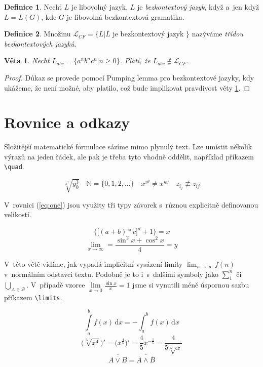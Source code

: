 \documentclass[11pt,a4paper,twocolumn,oneside]{article}
\theoremstyle{definition}
\newtheorem{definice}{Definice}[section]
\theoremstyle{plain}
\theoremstyle{plain}
\newtheorem{veta}{Věta}
\begin{document}
	\begin{definice}
Nechť $L$ je libovolný jazyk. $L$ je {\itshape bezkontextový jazyk}, když a~jen když $L=L(G)$, kde $G$ je libovolná bezkontextová gramatika.
	\end{definice}	
	
	\begin{definice}
Množinu $\mathcal{L}_{CF}=\{L|L$ je bezkontextový jazyk $\}$ nazýváme {\itshape třídou bezkontextových jazyků}.
	\end{definice}
	
	\begin{veta} \label{veta_1}
{\itshape Nechť} $L_{abc}=\{a^n b^n c^n|n \geq 0\}$. Platí, že $L_{abc} \notin \mathcal{L}_{CF}$.
	\end{veta}

\begin{proof}
\noindent Důkaz se provede pomocí Pumping lemma pro bezkontextové jazyky, kdy ukážeme, že není možné, aby platilo, což bude implikovat pravdivost věty \ref{veta_1}.
\end{proof}

	\section{Rovnice a odkazy}

Složitější matematické formulace sázíme mimo plynulý text. Lze umístit několik výrazů na jeden řádek, ale pak je třeba tyto vhodně oddělit, například příkazem \verb|\quad|.

$$\sqrt[x^2]{y^3_0} \quad \mathbb{N}=\{0,1,2,...\} \quad x^{y^y} \neq x^{yy} \quad z_{i_j} \not\equiv z_{ij}$$

V~rovnici (\ref{eq:one}) jsou využity tři typy závorek s~různou explicitně definovanou velikostí. \medskip

\begin{equation} \label{eq:one}
\bigg\{\Big[(a+b)*c\Big]^d +1\bigg\}=x
\end{equation}
$$\lim_{x\to\infty}= \frac{\sin^2x+\cos^2x}{4}=y$$

V~této větě vidíme, jak vypadá implicitní vysázení limity $\lim_{n\to\infty}f(n)$ v~normálním odstavci textu. Podobně je to i~s~dalšími symboly jako $\sum\nolimits _{1}^{n}$ či $\bigcup_{A \in \mathcal{B}}$. V~případě vzorce $\lim\limits_{x \to 0} \frac{\sin x}{x}=1$ jsme si vynutili méně úspornou sazbu příkazem \verb|\limits|. \medskip

\begin{equation}
\int\limits_a^b \! f(x) \, \mathrm{d}x=-\int_a^b \! f(x) \, \mathrm{d}x
\end{equation}
\begin{equation}
{\Big(\sqrt[5]{x^4}\Big)'}={\Big(x^{\frac{4}{5}}\Big)'}=\frac{4}{5}x^{-\frac{1}{5}}=\frac{4}{5 \sqrt[5]{x}}
\end{equation}
\begin{equation}
\overline{\overline{A \vee B}}=\overline{\overline{A} \wedge \overline{B}}
\end{equation}
\end{document}
